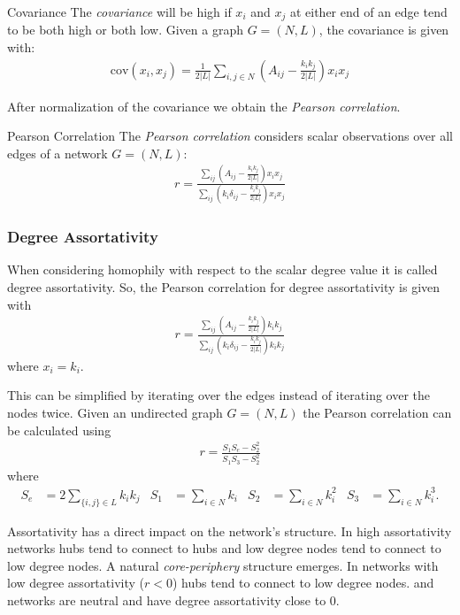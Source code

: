 \documentclass[english]{panikzettel}
\begin{document}
\begin{defi}{Covariance}
The \emph{covariance} will be high if $ x_i $ and $ x_j $ at either end of an edge tend to be both high or both low. Given a graph $ G = (N,L) $, the covariance is given with:
\begin{align*}
	\text{cov} (x_i, x_j) = \frac{1}{2 |L|} \sum\limits_{i,j \in N} \left(A_{ij} - \frac{k_i k_j}{2 |L|}\right) x_i x_j
\end{align*}
\end{defi}

After normalization of the covariance we obtain the \textit{Pearson correlation}.

\begin{defi}{Pearson Correlation}
The \emph{Pearson correlation} considers scalar observations over all edges of a network $ G = (N,L) $:
\begin{align*}
	r = \frac{\sum_{ij} (A_{ij} - \frac{k_i k_j}{2 |L|}) x_i x_j}{\sum_{ij} (k_i \delta_{ij} - \frac{k_i k_j}{2 |L|}) x_i x_j}
\end{align*}
\end{defi}

\subsubsection{Degree Assortativity}
When considering homophily with respect to the scalar degree value it is called degree assortativity.
So, the Pearson correlation for degree assortativity is given with
\begin{align*}
	r = \frac{\sum_{ij} (A_{ij} - \frac{k_i k_j}{2 |L|}) k_i k_j}{\sum_{ij} (k_i \delta_{ij} - \frac{k_i k_j}{2 |L|}) k_i k_j}
\end{align*}
where $ x_i = k_i $.

This can be simplified by iterating over the edges instead of iterating over the nodes twice. Given an undirected graph $ G = (N,L) $ the Pearson correlation can be calculated using
\begin{align*}
	r = \frac{S_1 S_e - S_2^2}{S_1 S_3 - S_2^2}
\end{align*}
where
\begin{align*}
	S_e &= 2 \sum\limits_{\{i,j\} \in L} k_i k_j & S_1 &= \sum\limits_{i \in N} k_i & S_2 &= \sum\limits_{i \in N} k_i^2 & S_3 &= \sum\limits_{i \in N} k_i^3.
\end{align*}

Assortativity has a direct impact on the network's structure.
In high assortativity networks hubs tend to connect to hubs and low degree nodes tend to connect to low degree nodes.
A natural \textit{core-periphery} structure emerges.
In networks with low degree assortativity ($ r < 0 $) hubs tend to connect to low degree nodes.
\hyperref[sec:erdosrenyi_model]{\erdosrenyi} and \hyperref[sec:barabasi_albert_model]{\barabasi} networks are neutral and have degree assortativity close to 0.
\end{document}
